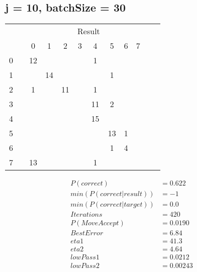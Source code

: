 \documentclass[10pt, conference, compsocconf]{IEEEtran}
\begin{document}
\subsection{j = 10, batchSize = 30}
\begin{center}
\begin{tabular}{l*{10}{c}r}
& & & & & \multicolumn{2}{c}{Result}  & & \\
 &\vline& 0 & 1 & 2 & 3 & 4 & 5 & 6 & 7 \\
\hline
0&\vline& 12&   &    &    &   1&    &    &    \\
1 &\vline&   &  14&    &    &    &   1&    &    \\
2 &\vline&  1&    &  11&    &   1&    &    &    \\
3 &\vline&   &    &    &    &  11&   2&    &    \\
4 &\vline&   &    &    &    &  15&    &    &    \\
5 &\vline&   &    &    &    &    &  13&   1&    \\
6 &\vline&   &    &    &    &    &  1 &   4&    \\
7 &\vline& 13&    &    &    &   1&    &    &    \\
\end{tabular}
\begin{align}
P( correct ) &= 0.622\\
min( P( correct |  result  ) ) &=  -1\\
min( P( correct | target ) ) &=  0.0\\
Iterations &= 420\\
P(Move Accept) &= 0.0190\\
Best Error &= 6.84\\
eta1 &= 41.3\\
eta2 &= 4.64\\
lowPass1 &= 0.0212\\
lowPass2 &= 0.00243
\end{align}
\end{center}
\end{document}
